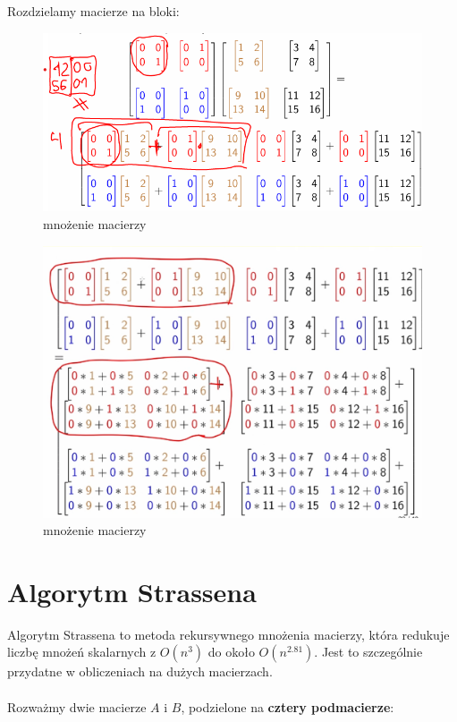 \documentclass{article}
\begin{document}
Rozdzielamy macierze na bloki:
\begin{figure}[h]
    \centering
    \includegraphics[scale=0.7]{zdj2.png}
    \caption{mnożenie macierzy}
    \label{fig:matrix_mult}
\end{figure}
\begin{figure}[h]
    \centering
    \includegraphics[scale=0.5]{zdj3.png}
    \caption{mnożenie macierzy}
    \label{fig:matrix_mult}
\end{figure}
\newpage
\section{Algorytm Strassena}
Algorytm Strassena to metoda rekursywnego mnożenia macierzy, która redukuje liczbę mnożeń skalarnych z \( O(n^3) \) do około \( O(n^{2.81}) \). Jest to szczególnie przydatne w obliczeniach na dużych macierzach.\\
\\
Rozważmy dwie macierze \( A \) i \( B \), podzielone na \textbf{cztery podmacierze}:
\end{document}
